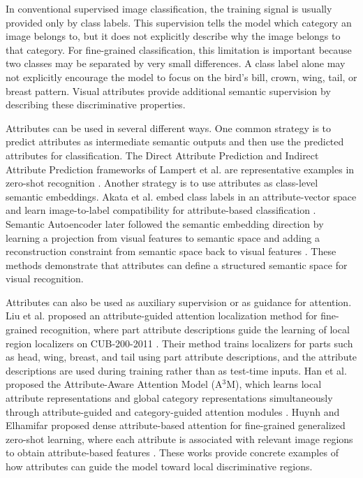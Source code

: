 In conventional supervised image classification, the training signal is usually provided only by class labels. This supervision tells the model which category an image belongs to, but it does not explicitly describe why the image belongs to that category. For fine-grained classification, this limitation is important because two classes may be separated by very small differences. A class label alone may not explicitly encourage the model to focus on the bird's bill, crown, wing, tail, or breast pattern. Visual attributes provide additional semantic supervision by describing these discriminative properties.

Attributes can be used in several different ways. One common strategy is to predict attributes as intermediate semantic outputs and then use the predicted attributes for classification. The Direct Attribute Prediction and Indirect Attribute Prediction frameworks of Lampert et al. are representative examples in zero-shot recognition \cite{lampert2009attributetransfer, lampert2014attributebased}. Another strategy is to use attributes as class-level semantic embeddings. Akata et al. embed class labels in an attribute-vector space and learn image-to-label compatibility for attribute-based classification \cite{akata2013labelembedding, Akata_2016}. Semantic Autoencoder later followed the semantic embedding direction by learning a projection from visual features to semantic space and adding a reconstruction constraint from semantic space back to visual features \cite{kodirov2017semantic}. These methods demonstrate that attributes can define a structured semantic space for visual recognition.

Attributes can also be used as auxiliary supervision or as guidance for attention. Liu et al. proposed an attribute-guided attention localization method for fine-grained recognition, where part attribute descriptions guide the learning of local region localizers on CUB-200-2011 \cite{liu2017localizing}. Their method trains localizers for parts such as head, wing, breast, and tail using part attribute descriptions, and the attribute descriptions are used during training rather than as test-time inputs. Han et al. proposed the Attribute-Aware Attention Model (A$^3$M), which learns local attribute representations and global category representations simultaneously through attribute-guided and category-guided attention modules \cite{han2018attribute}. Huynh and Elhamifar proposed dense attribute-based attention for fine-grained generalized zero-shot learning, where each attribute is associated with relevant image regions to obtain attribute-based features \cite{huynh2020DenseAttribute}. These works provide concrete examples of how attributes can guide the model toward local discriminative regions.

